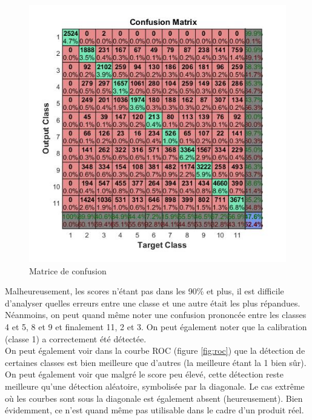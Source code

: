 \begin{figure}[h]
  \centering
    \includegraphics[width=0.8\linewidth]{img/ann/results/matrice_confu.jpg}
  \caption{Matrice de confusion}
  \label{fig:matrice_confu}
\end{figure}

Malheureusement, les scores n'étant pas dans les 90\% et plus, il est difficile d'analyser quelles erreurs entre une classe et une autre était les plus répandues. Néanmoins, on peut quand même noter une confusion prononcée entre les classes 4 et 5, 8 et 9 et finalement 11, 2 et 3. On peut également noter que la calibration (classe 1) a correctement été détectée.\\

On peut également voir dans la courbe ROC (figure \ref{fig:roc}) que la détection de certaines classes est bien meilleure que d'autres (la meilleure étant la 1 bien sûr). On peut également voir que malgré le score peu élevé, cette détection reste meilleure qu'une détection aléatoire, symbolisée par la diagonale. Le cas extrême où les courbes sont sous la diagonale est également absent (heureusement). Bien évidemment, ce n'est quand même pas utilisable dans le cadre d'un produit réel.

